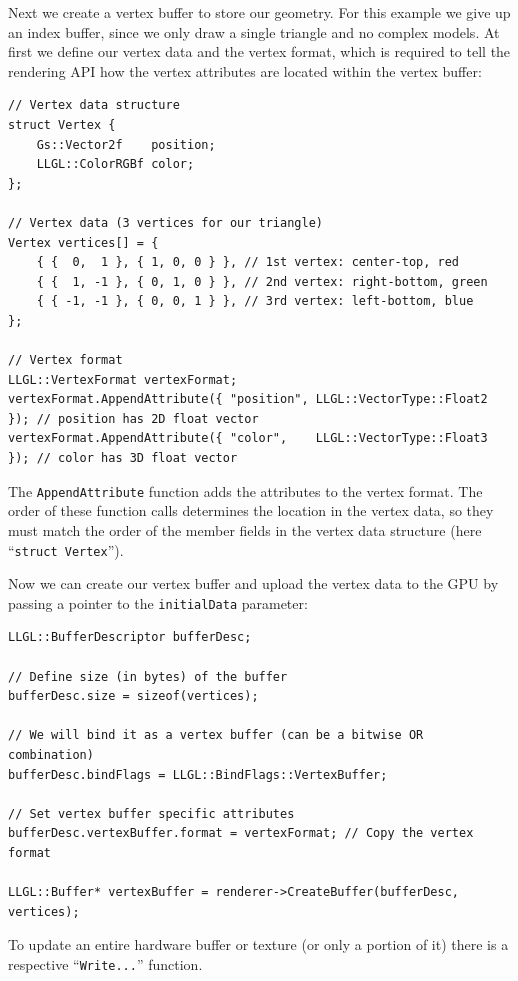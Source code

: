 \documentclass{article}
\begin{document}
Next we create a vertex buffer to store our geometry. For this example we give up an index buffer,
since we only draw a single triangle and no complex models. At first we define our vertex data and the vertex format,
which is required to tell the rendering API how the vertex attributes are located within the vertex buffer:
\begin{lstlisting}
// Vertex data structure
struct Vertex {
    Gs::Vector2f    position;
    LLGL::ColorRGBf color;
};

// Vertex data (3 vertices for our triangle)
Vertex vertices[] = {
    { {  0,  1 }, { 1, 0, 0 } }, // 1st vertex: center-top, red
    { {  1, -1 }, { 0, 1, 0 } }, // 2nd vertex: right-bottom, green
    { { -1, -1 }, { 0, 0, 1 } }, // 3rd vertex: left-bottom, blue
};

// Vertex format
LLGL::VertexFormat vertexFormat;
vertexFormat.AppendAttribute({ "position", LLGL::VectorType::Float2 }); // position has 2D float vector
vertexFormat.AppendAttribute({ "color",    LLGL::VectorType::Float3 }); // color has 3D float vector
\end{lstlisting}
The \texttt{AppendAttribute} function adds the attributes to the vertex format.
The order of these function calls determines the location in the vertex data, so they must match
the order of the member fields in the vertex data structure (here ``\texttt{struct Vertex}'').

Now we can create our vertex buffer and upload the vertex data to the GPU by passing a pointer
to the \texttt{initialData} parameter:
\begin{lstlisting}
LLGL::BufferDescriptor bufferDesc;

// Define size (in bytes) of the buffer
bufferDesc.size = sizeof(vertices);

// We will bind it as a vertex buffer (can be a bitwise OR combination)
bufferDesc.bindFlags = LLGL::BindFlags::VertexBuffer;

// Set vertex buffer specific attributes
bufferDesc.vertexBuffer.format = vertexFormat; // Copy the vertex format

LLGL::Buffer* vertexBuffer = renderer->CreateBuffer(bufferDesc, vertices);
\end{lstlisting}
To update an entire hardware buffer or texture (or only a portion of it) there is a respective
``\texttt{Write...}'' function.
\end{document}
